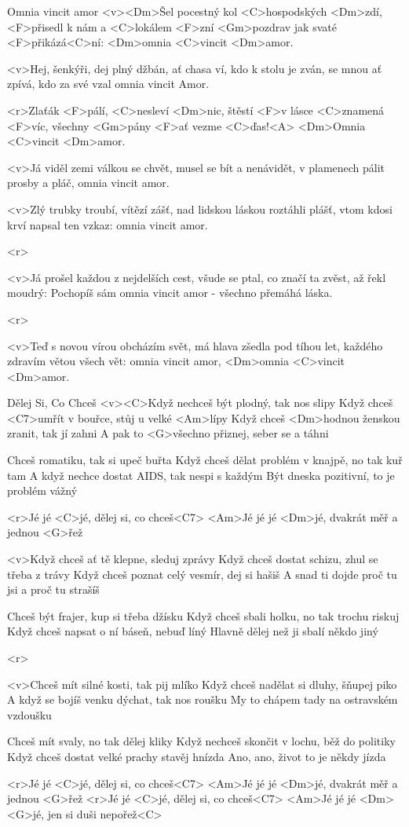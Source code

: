 \begin{song}[Klíč]{89}{Omnia vincit amor}{}
	<v><Dm>Šel pocestný kol <C>hospodských <Dm>zdí,
	<F>přisedl k nám a <C>lokálem <F>zní
	<Gm>pozdrav jak svaté <F>přikázá<C>ní:
	<Dm>omnia <C>vincit <Dm>amor.

	<v>Hej, šenkýři, dej plný džbán,
	ať chasa ví, kdo k stolu je zván,
	se mnou ať zpívá, kdo za své vzal
	omnia vincit Amor.

	<r>Zlaťák <F>pálí, <C>nesleví <Dm>nic,
	štěstí <F>v lásce <C>znamená <F>víc,
	všechny <Gm>pány <F>ať vezme <C>ďas!<A>
	<Dm>Omnia <C>vincit <Dm>amor.

	<v>Já viděl zemi válkou se chvět,
	musel se bít a nenávidět,
	v plamenech pálit prosby a pláč,
	omnia vincit amor.

	<v>Zlý trubky troubí, vítězí zášť,
	nad lidskou láskou roztáhli plášť,
	vtom kdosi krví napsal ten vzkaz:
	omnia vincit amor.

	<r>

	<v>Já prošel každou z nejdelších cest,
	všude se ptal, co značí ta zvěst,
	až řekl moudrý: Pochopíš sám
	omnia vincit amor - všechno přemáhá láska.

	<r>

	<v>Teď s novou vírou obcházím svět,
	má hlava zšedla pod tíhou let,
	každého zdravím větou všech vět:
	omnia vincit amor,
	<Dm>omnia <C>vincit <Dm>amor.
\end{song}

\begin{song}{90}{Dělej Si, Co Chceš}{}
	<v><C>Když nechceš být plodný, tak nos slipy
	Když chceš <C7>umřít v bouřce, stůj u velké <Am>lípy
	Když chceš <Dm>hodnou ženskou zranit, tak jí zahni
	A pak to <G>všechno přiznej, seber se a táhni

	Chceš romatiku, tak si upeč buřta
	Když chceš dělat problém v knajpě, no tak kuř tam
	A když nechce dostat AIDS, tak nespi s každým
	Být dneska pozitivní, to je problém vážný

	<r>Jé jé <C>jé, dělej si, co chceš<C7>
	<Am>Jé jé jé <Dm>jé, dvakrát měř a jednou <G>řež

	<v>Když chceš ať tě klepne, sleduj zprávy
	Když chceš dostat schizu, zhul se třeba z trávy
	Když chceš poznat celý vesmír, dej si hašiš
	A snad ti dojde proč tu jsi a proč tu strašíš

	Chceš být frajer, kup si třeba džísku
	Když chceš sbali holku, no tak trochu riskuj
	Když chceš napsat o ní báseň, nebuď líný
	Hlavně dělej než ji sbalí někdo jiný

	<r>

	<v>Chceš mít silné kosti, tak pij mlíko
	Když chceš nadělat si dluhy, šňupej piko
	A když se bojíš venku dýchat, tak nos roušku
	My to chápem tady na ostravském vzdoušku

	Chceš mít svaly, no tak dělej kliky
	Když nechceš skončit v lochu, běž do politiky
	Když chceš dostat velké prachy stavěj hnízda
	Ano, ano, život to je někdy jízda

	<r>Jé jé <C>jé, dělej si, co chceš<C7>
	<Am>Jé jé jé <Dm>jé, dvakrát měř a jednou <G>řež
	<r>Jé jé <C>jé, dělej si, co chceš<C7>
	<Am>Jé jé jé <Dm><G>jé, jen si duši nepořež<C>
\end{song}

